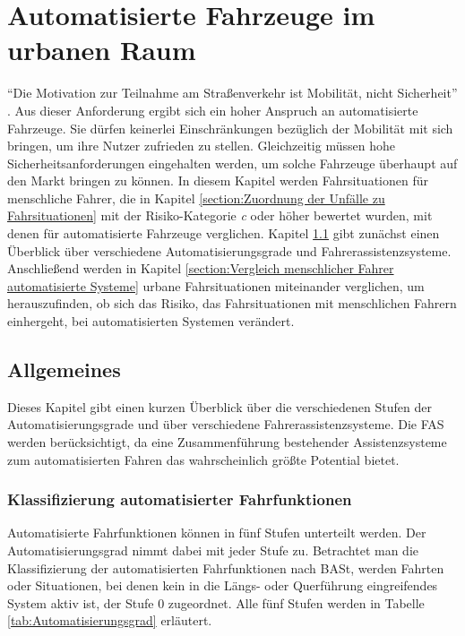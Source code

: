 
\chapter{Automatisierte Fahrzeuge im urbanen Raum}\label{chapter:automatisiertes Fahren}
\enquote{Die Motivation zur Teilnahme am Straßenverkehr ist Mobilität, nicht Sicherheit} \parencite[S. 146]{Huguenin.2017}. Aus dieser Anforderung ergibt sich ein hoher Anspruch an automatisierte Fahrzeuge. Sie dürfen keinerlei Einschränkungen bezüglich der Mobilität mit sich bringen, um ihre Nutzer zufrieden zu stellen. Gleichzeitig müssen hohe Sicherheitsanforderungen eingehalten werden, um solche Fahrzeuge überhaupt auf den Markt bringen zu können. In diesem Kapitel werden Fahrsituationen für menschliche Fahrer, die in Kapitel \ref{section:Zuordnung der Unfälle zu Fahrsituationen} mit der Risiko-Kategorie \textit{c} oder höher bewertet wurden, mit denen für automatisierte Fahrzeuge verglichen. Kapitel \ref{section:Allgemeines} gibt zunächst einen Überblick über verschiedene Automatisierungsgrade und Fahrerassistenzsysteme. Anschließend werden in Kapitel \ref{section:Vergleich menschlicher Fahrer automatisierte Systeme} urbane Fahrsituationen miteinander verglichen, um herauszufinden, ob sich das Risiko, das Fahrsituationen mit menschlichen Fahrern einhergeht, bei automatisierten Systemen verändert.

\section{Allgemeines}\label{section:Allgemeines}
Dieses Kapitel gibt einen kurzen Überblick über die verschiedenen Stufen der Automatisierungsgrade und über verschiedene Fahrerassistenzsysteme. Die FAS werden berücksichtigt, da eine Zusammenführung bestehender Assistenzsysteme zum automatisierten Fahren das wahrscheinlich größte Potential bietet.

\subsection{Klassifizierung automatisierter Fahrfunktionen}
Automatisierte Fahrfunktionen können in fünf Stufen unterteilt werden. Der Automatisierungsgrad nimmt dabei mit jeder Stufe zu. Betrachtet man die Klassifizierung der automatisierten Fahrfunktionen nach \ac{BASt}, werden Fahrten oder Situationen, bei denen kein in die Längs- oder Querführung eingreifendes System aktiv ist, der Stufe 0 zugeordnet. Alle fünf Stufen werden in Tabelle \ref{tab:Automatisierungsgrad} erläutert.

